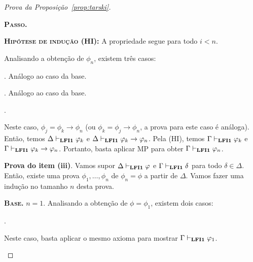 \begin{proof}[Prova da Proposição~\ref{prop:tarski}]
\begin{adjustwidth}{1cm}{}
\begin{adjustwidth}{1cm}{}
\begin{provaporcasos}
                    \end{provaporcasos}

                    \noindent\textbf{\textsc{Passo.}} 
                
                    \noindent \textbf{\textsc{Hipótese de indução (HI):}} A propriedade segue para todo $i < n$.
    
                    Analisando a obtenção de $\phi_n$, existem três casos:

                    \begin{provaporsubcasos}

                        . Análogo ao caso da base.
                    
                        . Análogo ao caso da base.

                        .

                        Neste caso, $\phi_j = \phi_k \to \phi_n$ (ou $\phi_k = \phi_j \to \phi_n$, a prova para este caso é análoga). Então, temos $\Delta \vdash_{{\normalfont\textbf{LFI1}}{}} \varphi_k$ e $\Delta \vdash_{{\normalfont\textbf{LFI1}}{}} \varphi_k \to \varphi_n$. Pela (HI), temos $\Gamma \vdash_{{\normalfont\textbf{LFI1}}{}} \varphi_k$ e $\Gamma \vdash_{{\normalfont\textbf{LFI1}}{}} \varphi_k \to \varphi_n$. Portanto, basta aplicar MP para obter $\Gamma \vdash_{{\normalfont\textbf{LFI1}}{}} \varphi_n$.
                    \end{provaporsubcasos}

                \end{adjustwidth}
                
                \noindent{}\textbf{Prova do item (iii)}. Vamos supor $\Delta \vdash_{{\normalfont\textbf{LFI1}}{}} \varphi$ e $\Gamma \vdash_{{\normalfont\textbf{LFI1}}{}} \delta$ para todo $\delta \in \Delta$. Então, existe uma prova $\phi_1, \ldots, \phi_n$ de $\phi_n = \phi$ a partir de $\Delta$. Vamos fazer uma indução no tamanho $n$ desta prova.
                
                \begin{adjustwidth}{1cm}{}
                    
                    \textbf{\textsc{Base.}} $n = 1$.
                    Analisando a obtenção de $\phi = \phi_1$, existem dois casos:

                    \begin{provaporcasos}

                    . 
                    
                        Neste caso, basta aplicar o mesmo axioma para mostrar $\Gamma \vdash_{{\normalfont\textbf{LFI1}}{}} \varphi_1$.
                    

\end{provaporcasos}
\end{adjustwidth}
\end{adjustwidth}
\end{proof}
